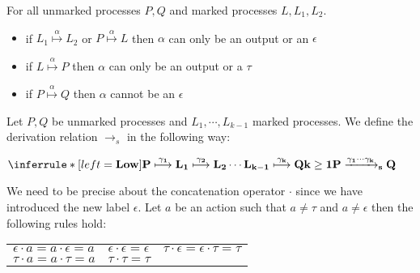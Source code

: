 \begin{lemma}\label{multioutconstraintswithmarked}
  For all unmarked processes $P,Q$ and marked processes $L, L_{1}, L_{2}$.
  \begin{itemize}
    \item
      if $L_{1}\stackrel{\alpha}{\longmapsto}L_{2}$ or  $P\stackrel{\alpha}{\longmapsto}L$ then $\alpha$ can only be an output or an $\epsilon$
    \item
      if $L\stackrel{\alpha}{\longmapsto}P$ then $\alpha$ can only be an output or a $\tau$
    \item
      if $P\stackrel{\alpha}{\longmapsto}Q$ then $\alpha$ cannot be an $\epsilon$
  \end{itemize}
\end{lemma}


\begin{definition}
  Let $P, Q$ be unmarked processes and $L_{1}, \cdots, L_{k-1}$ marked processes. We define the derivation relation $\rightarrow_{s}$ in the following way:
  \begin{center}
    $\inferrule* [left=\bf{Low}]{
	P \stackrel{\gamma_{1}}{\longmapsto} L_{1} \stackrel{\gamma_{2}}{\longmapsto} L_{2} \cdots L_{k-1} \stackrel{\gamma_{k}}{\longmapsto} Q
      \\
	k\geq 1
    }{
      P \xrightarrow{\gamma_{1} \cdots \gamma_{k}}_{s}  Q
    }$
  \end{center}
  We need to be precise about the concatenation operator $\cdot$ since we have introduced the new label $\epsilon$. Let $a$ be an action such that $a\neq \tau$ and $a\neq \epsilon$ then the following rules hold:
  \begin{center}
      \begin{tabular}{lll}
	  $\epsilon \cdot a = a \cdot \epsilon = a$
	&
	  $\epsilon \cdot \epsilon = \epsilon$
	&
	  $\tau \cdot \epsilon = \epsilon \cdot \tau = \tau$
	\\
	  $\tau \cdot a = a \cdot \tau = a$
	&
	  $\tau \cdot \tau = \tau$
	&
      \end{tabular}
  \end{center}
\end{definition}


